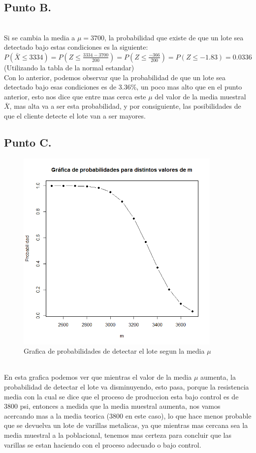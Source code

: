 \documentclass[letterpaper,12pt,onecolumn,titlepage]{article}
\begin{document}
\subsection{Punto B.}
~\\ Si se cambia la media a $\mu=3700$, la probabilidad que existe de que un lote sea detectado bajo estas condiciones es la siguiente:
~\\ $P(\bar{X}\leq3334)=P(Z\leq\frac{3334-3700}{200})=P(Z\leq\frac{-366}{200})=P(Z\leq-1.83)=0.0336$ (Utilizando la tabla de la normal estandar)
~\\ Con lo anterior, podemos observar que la probabilidad de que un lote sea detectado bajo esas condiciones es de 3.36\%, un poco mas alto que en el punto anterior, esto nos dice que entre mas cerca este $\mu$ del valor de la media muestral $\bar{X}$, mas alta va a ser esta probabilidad, y por consiguiente, las posibilidades de que el cliente detecte el lote van a ser mayores.
\pagebreak \subsection{Punto C.}
\begin{figure}[!h]
    \begin{center}
        \includegraphics[width=10cm]{Figuras/5.png}
        \caption{Grafica de probabilidades de detectar el lote segun la media $\mu$}
        \label{fig:Densidad}
    \end{center}
\end{figure}
~\\ En esta grafica podemos ver que mientras el valor de la media $\mu$ aumenta, la probabilidad de detectar el lote va disminuyendo, esto pasa, porque la resistencia media con la cual se dice que el proceso de produccion esta bajo control es de 3800 psi, entonces a medida que la media muestral aumenta, nos vamos acercando mas a la media teorica (3800 en este caso), lo que hace menos probable que se devuelva un lote de varillas metalicas, ya que mientras mas cercana sea la media muestral a la poblacional, tenemos mas certeza para concluir que las varillas se estan haciendo con el proceso adecuado o bajo control.
\end{document}
